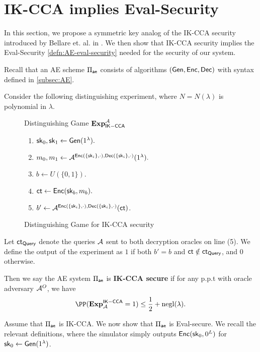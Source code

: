 \section{IK-CCA implies Eval-Security}
\label{sec:IND-CCPKA}
In this section, we propose a symmetric key analog of the IK-CCA security introduced by Bellare et. al. in \cite[Definition 1]{BBDP01keyprivate}.
We then show that IK-CCA security implies the Eval-Security \cref{defn:AE-eval-security} needed for the security of our system.

Recall that an AE scheme $\Pi_{\mathsf{ae}}$ consists of algorithms $(\mathsf{Gen}, \mathsf{Enc}, \mathsf{Dec})$ with syntax defined in \cref{subsec:AE}. 

\begin{definition}[IK-CCA]
\label{defn:AE-IK-CCA}
Consider the following distinguishing experiment, where $N = N(\lambda)$ is polynomial in $\lambda$.
\begin{figure}[ht!]
\begin{framed}
Distinguishing Game $\mathbf{Exp}_{\mathsf{IK-CCA}}^{\mathcal{A}}$
\begin{enumerate}
    \item ${\mathsf{sk}}_0, {\mathsf{sk}}_1 \leftarrow \mathsf{Gen}(1^{\lambda}).$
    \item $m_0, m_1 \leftarrow \mathcal{A}^{\mathsf{Enc}(\{{\mathsf{sk}}_{i}\}, \cdot), \mathsf{Dec}(\{{\mathsf{sk}}_{i}\}, \cdot)}(1^{\lambda}).$
    \item $b \leftarrow U(\{0, 1\})$.
    \item $\mathsf{ct} \leftarrow \mathsf{Enc}({\mathsf{sk}}_b, m_b).$
    \item $b' \leftarrow \mathcal{A}^{\mathsf{Enc}(\{{\mathsf{sk}}_{i}\}, \cdot), \mathsf{Dec}(\{{\mathsf{sk}}_{i}\}, \cdot)}(\mathsf{ct})$.
\end{enumerate}
\end{framed}
\caption{Distinguishing Game for IK-CCA security}
\label{expr:AE-IKCCA-Distinguish}
\end{figure}

Let $\mathsf{ct}_{\mathsf{Query}}$ denote the queries $\mathcal{A}$ sent to both decryption oracles on line (5).  We define the output of the experiment as $1$ if both $b' = b$ and $\mathsf{ct} \notin \mathsf{ct}_{\mathsf{Query}}$, and $0$ otherwise. 

Then we say the AE system $\Pi_{\mathsf{ae}}$ is \textbf{IK-CCA secure} if for any p.p.t with oracle adversary $\mathcal{A}^O$, we have
$$\PP(\mathbf{Exp}^{\mathsf{IK-CCA}}_{\cA} = 1) \leq \frac{1}{2} + \negl(\lambda).$$
\end{definition}

Assume that $\Pi_{\mathsf{ae}}$ is IK-CCA. We now show that $\Pi_{\mathsf{ae}}$ is Eval-secure. We recall the relevant definitions, where the simulator simply outputs $\mathsf{Enc}({\mathsf{sk}}_{0}, 0^{L})$ for ${\mathsf{sk}}_0 \leftarrow \mathsf{Gen}(1^{\lambda})$.

